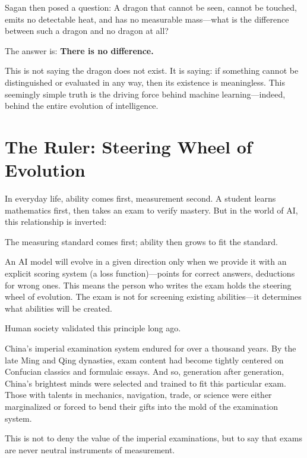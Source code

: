 Sagan then posed a question: A dragon that cannot be seen, cannot be touched, emits no detectable heat, and has no measurable mass---what is the difference between such a dragon and no dragon at all?

The answer is: \textbf{There is no difference.}

\vspace{1em}

This is not saying the dragon does not exist. It is saying: if something cannot be distinguished or evaluated in any way, then its existence is meaningless. This seemingly simple truth is the driving force behind machine learning---indeed, behind the entire evolution of intelligence.

\newpage
\section{The Ruler: Steering Wheel of Evolution}

In everyday life, ability comes first, measurement second. A student learns mathematics first, then takes an exam to verify mastery. But in the world of AI, this relationship is inverted:

The measuring standard comes first; ability then grows to fit the standard.

\vspace{1em}


An AI model will evolve in a given direction only when we provide it with an explicit scoring system (a loss function)---points for correct answers, deductions for wrong ones.
This means the person who writes the exam holds the steering wheel of evolution.
The exam is not for screening existing abilities---it determines what abilities will be created.

\vspace{1em}

Human society validated this principle long ago.

China's imperial examination system endured for over a thousand years. By the late Ming and Qing dynasties, exam content had become tightly centered on Confucian classics and formulaic essays. And so, generation after generation, China's brightest minds were selected and trained to fit this particular exam. Those with talents in mechanics, navigation, trade, or science were either marginalized or forced to bend their gifts into the mold of the examination system.

This is not to deny the value of the imperial examinations, but to say that exams are never neutral instruments of measurement.

